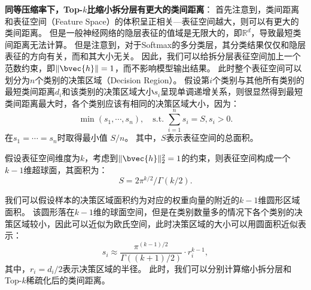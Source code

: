 \textbf{同等压缩率下，Top-$k$比缩小拆分层有更大的类间距离}：
首先注意到，类间距离和表征空间（Feature Space）的体积呈正相关---表征空间越大，则可以有更大的类间距离。
%
但是一般神经网络的隐层表征的值域是无限大的，即$\mathbb R^d$，导致最短类间距离无法计算。
%
但是注意到，对于Softmax的多分类层，其分类结果仅仅和隐层表征的方向有关，而和其大小无关。
%
因此，我们可以给拆分层表征空间加上一个范数约束，即$\Vert \bvec{h} \Vert = 1$，而不影响模型输出结果。
%
此时整个表征空间可以划分为$n$个类别的决策区域（Decision Region）。
假设第$i$个类别与其他所有类别的最短类间距离$d_i$和该类别的决策区域大小$s_i$呈现单调递增关系，则很显然得到最短类间距离最大时，各个类别应该有相同的决策区域大小，因为：
\begin{equation}
    \min (s_1, \cdots, s_n), \quad \text{s.t. } {\sum_{i=1}^n s_i = S, s_i > 0}.
\end{equation}
在$s_1 = \cdots = s_n$时取得最小值 $S/n$。
其中，$S$表示表征空间的总面积。

假设表征空间维度为$k$，考虑到$\Vert \bvec{h} \Vert^2_2 = 1$的约束，则表征空间构成一个$k-1$维超球面，其面积为：
\begin{equation}
    S = 2\pi^{k/2}/\Gamma(k/2).
\end{equation}



我们可以假设样本的决策区域面积约为对应的权重向量的附近的$k-1$维圆形区域面积。
该圆形落在$k-1$维的球面空间，但是在类别数量多的情况下各个类别的决策区域较小，因此可以近似为欧氏空间，此时决策区域的大小可以用圆面积近似表示：
\begin{equation}
    s_i \approx \dfrac{\pi^{(k-1)/2}}{\Gamma((k+1)/2)} \cdot r_i^{k-1},
\end{equation}
其中，$r_i = d_i/2$表示决策区域的半径。
%
此时，我们可以分别计算缩小拆分层和Top-$k$稀疏化后的类间距离。



